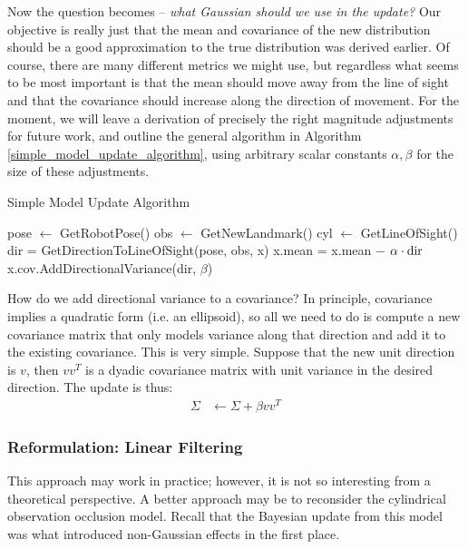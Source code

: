 \documentclass[12pt]{article}
\begin{document}
Now the question becomes -- \textit{what Gaussian should we use in the update?} Our objective is really just that the mean and covariance of the new distribution should be a good approximation to the true distribution was derived earlier. Of course, there are many different metrics we might use, but regardless what seems to be most important is that the mean should move away from the line of sight and that the covariance should increase along the direction of movement. For the moment, we will leave a derivation of precisely the right magnitude adjustments for future work, and outline the general algorithm in Algorithm \ref{simple_model_update_algorithm}, using arbitrary scalar constants $\alpha, \beta$ for the size of these adjustments.

\begin{algorithm}
  \caption{Simple Model Update Algorithm}
  \label{simple_model_update_algorithm}
  \begin{algorithmic}
      \STATE pose $\leftarrow$ GetRobotPose()
      \STATE obs $\leftarrow$ GetNewLandmark()
      \STATE cyl $\leftarrow$ GetLineOfSight()
        \STATE dir = GetDirectionToLineOfSight(pose, obs, x)
        \STATE x.mean = x.mean $-$ $\alpha \cdot \textnormal{dir}$
        \STATE x.cov.AddDirectionalVariance(dir, $\beta$)
      \ENDFOR
    \ENDWHILE
  \end{algorithmic}
\end{algorithm}

How do we add directional variance to a covariance? In principle, covariance implies a quadratic form (i.e. an ellipsoid), so all we need to do is compute a new covariance matrix that only models variance along that direction and add it to the existing covariance. This is very simple. Suppose that the new unit direction is $v$, then $v v^T$ is a dyadic covariance matrix with unit variance in the desired direction. The update is thus:
\begin{align}
  \Sigma &\leftarrow \Sigma + \beta v v^T
\end{align}

\subsubsection{Reformulation: Linear Filtering}

This approach may work in practice; however, it is not so interesting from a theoretical perspective. A better approach may be to reconsider the cylindrical observation occlusion model. Recall that the Bayesian update from this model was what introduced non-Gaussian effects in the first place.
\end{document}
